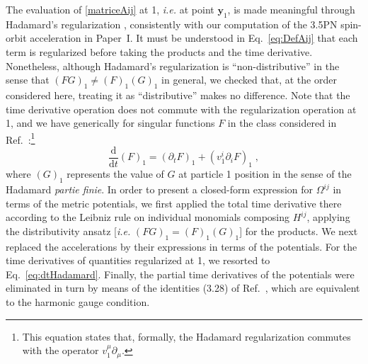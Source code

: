 \documentclass[
superscriptaddress,
preprint,
prd,tightenlines,showpacs,nofootinbib,
eqsecnum,
amsfonts,amsmath,amssymb]{revtex4-1}
\newcommand{\ud}{\mathrm{d}}
\begin{document}
The evaluation of \eqref{matriceAij} at 1, \textit{i.e.} at point
$\mathbf{y}_1$, is made meaningful through Hadamard's regularization
\cite{Blanchet2000}, consistently with our computation of the 3.5PN
spin-orbit acceleration in Paper~I. It must be understood in
Eq.~\eqref{eq:DefAij} that each term is regularized before taking the
products and the time derivative.  Nonetheless, although Hadamard's
regularization is ``non-distributive'' in the sense that
$(FG)_{1}\neq(F)_{1}(G)_{1}$ in general, we checked that, at the order
considered here, treating it as ``distributive'' makes no difference.
Note that the time derivative operation does not commute with the
regularization operation at 1, and we have generically for singular
functions $F$ in the class considered in
Ref.~\cite{Blanchet2000}:\footnote{This equation states that,
  formally, the Hadamard regularization commutes with the operator
  $v^{\mu}_1\partial_{\mu}$.}
%
\begin{equation}\label{eq:dtHadamard}
	\frac{\ud}{\ud t} (F)_{1} = (\partial_{t}F)_{1} + 
(v_{1}^{i}\partial_{i}F)_{1} \; ,
\end{equation}
%
where $(G)_1$ represents the value of $G$ at particle 1 position in
the sense of the Hadamard \textit{partie finie}. In order to present a
closed-form expression for $\Omega^{ij}$ in terms of the metric
potentials, we first applied the total time derivative there according
to the Leibniz rule on individual monomials composing $H^{ij}$,
applying the distributivity ansatz [\textit{i.e.}
$(FG)_{1}=(F)_{1}(G)_{1}$] for the products. We next replaced the
accelerations by their expressions in terms of the potentials. For the
time derivatives of quantities regularized at 1, we resorted to
Eq.~\eqref{eq:dtHadamard}. Finally, the partial time derivatives of
the potentials were eliminated in turn by means of the identities
(3.28) of Ref.~\cite{Blanchet2001a}, which are equivalent to the
harmonic gauge condition.
 
\end{document}
